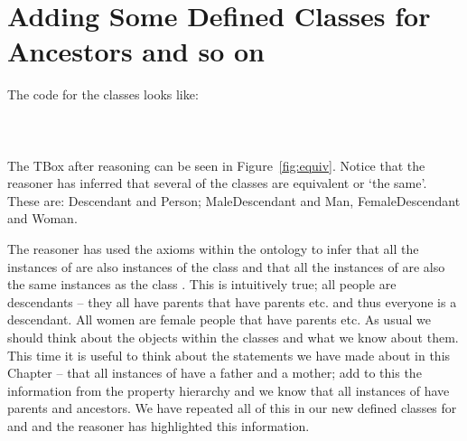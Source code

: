 \section{Adding Some Defined Classes for Ancestors and so on}
\label{sec:ancest-defined}

The code for the classes looks like:
\\\\
\\\\
The TBox after reasoning can be seen in Figure~\ref{fig:equiv}. Notice that the reasoner has inferred that several of the classes are equivalent or `the same'. These are: Descendant and Person; MaleDescendant and Man, FemaleDescendant and Woman.

The reasoner has used the axioms within the ontology to infer that all the instances of  are also instances of the class  and that all the instances of  are also the same instances as the class . This is intuitively true; all people are descendants -- they all have parents that have parents etc. and thus everyone is a descendant. All women are female people that have parents etc. As usual we should think about the objects within the classes and what we know about them. This time it is useful to think about the statements we have made about \person in this Chapter -- that all instances of \person have a father and a mother; add to this the information from the property hierarchy and we know that all instances of \person have parents and ancestors. We have repeated all of this in our new defined classes for  and  and the reasoner has highlighted this information.

